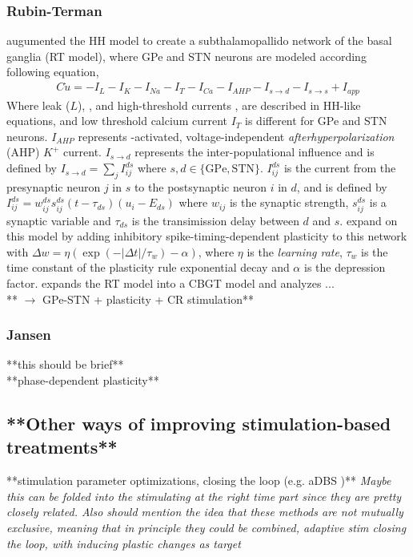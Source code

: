 \subsubsection{Rubin-Terman}
\cite{terman2002activity} augumented the HH model to create a subthalamopallido network of the
basal ganglia (RT model), where GPe and STN neurons are modeled according following equation,
\begin{align}
	C \dot u = - I_L - I_K - I_{Na} - I_T - I_{Ca} - I_{AHP} - I_{s \rightarrow d} -
	I_{s \rightarrow s} + I_{app}
\end{align}
Where leak ($L$), \K, \Na and high-threshold \Ca currents \cite{song2000characterization}, are
described in HH-like equations, and low threshold calcium current $I_T$ is different for GPe and
STN neurons. $I_{AHP}$ represents \Ca-activated, voltage-independent \textit{afterhyperpolarization}
(AHP) $K^+$ current. $I_{s \rightarrow d}$ represents the inter-populational influence and is
defined by
$I_{s \rightarrow d} = \sum_{j} I_{ij}^{ds}$ where $s, d \in \{\text{GPe}, \text{STN}\}$.
$I_{ij}^{ds}$ is the current from the presynaptic neuron $j$ in $s$ to the
postsynaptic neuron $i$ in $d$, and is defined by
$I_{ij}^{ds} = w_{ij}^{ds}s_{ij}^{ds}(t - \tau_{ds})(u_i - E_{ds})$ where $w_{ij}$ is the
synaptic strength, $s_{ij}^{ds}$ is a synaptic variable and $\tau_{ds}$ is the transimission
delay between $d$ and $s$.
\cite{madadi2022inhibitory} expand on this model by adding inhibitory spike-timing-dependent
plasticity to this network with $\Delta w = \eta(\exp(-|\Delta t| / \tau_w) - \alpha)$,
where $\eta$ is the \textit{learning rate}, $\tau_w$ is the time constant of the plasticity
rule exponential decay and $\alpha$ is the depression factor. \cite{rubin2012basal} expands
the RT model into a CBGT model and analyzes ... \\
**\cite{hauptmann2009cumulative, hauptmann2010restoration} $\rightarrow$ GPe-STN + plasticity +
CR stimulation**

\subsubsection{Jansen}
**this should be brief** \cite{jansen1995electroencephalogram} \cite{west2022stimulating} \\
**phase-dependent plasticity** \cite{duchet2023mean} \\


\subsection{**Other ways of improving stimulation-based treatments**}
**stimulation parameter optimizations, closing the loop (e.g. aDBS \cite{beudel2018adaptive})**
\textit{
	Maybe this can be folded into the stimulating at the right time part
	since they are pretty closely related. Also should mention the idea that
	these methods are not mutually exclusive, meaning that in principle they
	could be combined, adaptive stim closing the loop, with inducing plastic
	changes as target
}

